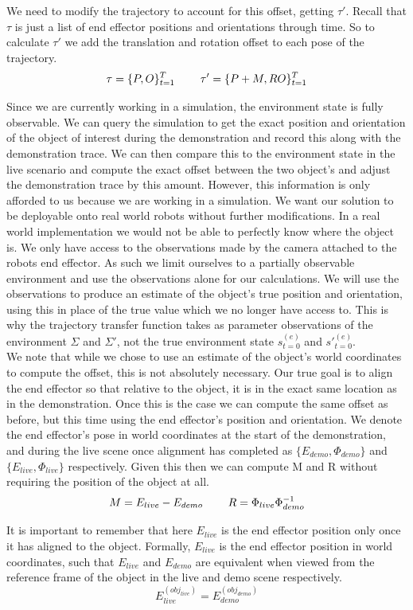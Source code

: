 We need to modify the trajectory to account for this offset, getting $\tau'$. Recall that $\tau$ is just a list of end effector positions and orientations through time. So to calculate $\tau'$ we add the translation and rotation offset to each pose of the trajectory.
$$\tau = \{P, O\}_{t=1}^T \operatorname{\operatorname{\: \: \: \:} \operatorname{\: \: \: \:}} \tau' = \{P + M, RO\}_{t=1}^T$$

Since we are currently working in a simulation, the environment state is fully observable. We can query the simulation to get the exact position and orientation of the object of interest during the demonstration and record this along with the demonstration trace. We can then compare this to the environment state in the live scenario and compute the exact offset between the two object's and adjust the demonstration trace by this amount. However, this information is only afforded to us because we are working in a simulation. We want our solution to be deployable onto real world robots without further modifications. In a real world implementation we would not be able to perfectly know where the object is. We only have access to the observations made by the camera attached to the robots end effector. As such we limit ourselves to a partially observable environment and use the observations alone for our calculations. We will use the observations to produce an estimate of the object's true position and orientation, using this in place of the true value which we no longer have access to. This is why the trajectory transfer function takes as parameter observations of the environment $\Sigma$ and $\Sigma'$, not the true environment state $s^{(e)}_{t=0}$ and $s'^{(e)}_{t=0}$.\\

We note that while we chose to use an estimate of the object's world coordinates to compute the offset, this is not absolutely necessary. Our true goal is to align the end effector so that relative to the object, it is in the exact same location as in the demonstration. Once this is the case we can compute the same offset as before, but this time using the end effector's position and orientation. We denote the end effector's pose in world coordinates at the start of the demonstration, and during the live scene once alignment has completed as $\{E_{demo}, \Phi_{demo}\}$ and $\{E_{live}, \Phi_{live}\}$ respectively. Given this then we can compute M and R without requiring the position of the object at all.
$$M = E_{live} - E_{demo} \operatorname{\operatorname{\: \: \: \:} \operatorname{\: \: \: \:}} R = \Phi_{live} \Phi_{demo}^{-1}$$

It is important to remember that here $E_{live}$ is the end effector position only once it has aligned to the object. Formally, $E_{live}$ is the end effector position in world coordinates, such that $E_{live}$ and $E_{demo}$ are equivalent when viewed from the reference frame of the object in the live and demo scene respectively.
$$E_{live}^{(obj_{live})} = E_{demo}^{(obj_{demo})}$$

